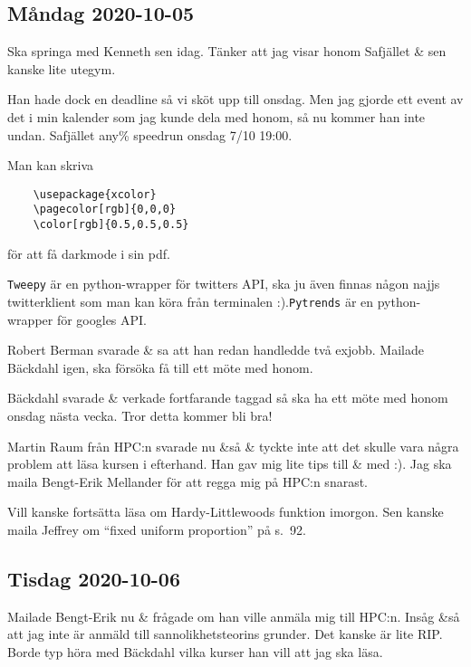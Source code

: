 \subsection{Måndag 2020-10-05}

Ska springa med Kenneth sen idag. Tänker att jag visar honom Safjället \& sen kanske lite utegym.

Han hade dock en deadline så vi sköt upp till onsdag. Men jag gjorde ett event av det i min kalender som jag kunde dela med honom, så nu kommer han inte undan. Safjället any\% speedrun onsdag 7/10 19:00.

\bigskip

Man kan skriva
\begin{verbatim}
	\usepackage{xcolor}
	\pagecolor[rgb]{0,0,0}
	\color[rgb]{0.5,0.5,0.5}
\end{verbatim}
för att få darkmode i sin pdf.

\verb|Tweepy| är en python-wrapper för twitters API, ska ju även finnas någon najjs twitterklient som man kan köra från terminalen :).\verb|Pytrends| är en python-wrapper för googles API.

\bigskip

Robert Berman svarade \& sa att han redan handledde två exjobb. Mailade Bäckdahl igen, ska försöka få till ett möte med honom.

Bäckdahl svarade \& verkade fortfarande taggad så ska ha ett möte med honom onsdag nästa vecka. Tror detta kommer bli bra!

Martin Raum från HPC:n svarade nu \&så \& tyckte inte att det skulle vara några problem att läsa kursen i efterhand. Han gav mig lite tips till \& med :). Jag ska maila Bengt-Erik Mellander för att regga mig på HPC:n snarast.

\bigskip

Vill kanske fortsätta läsa om Hardy-Littlewoods funktion imorgon. Sen kanske maila Jeffrey om \enquote{fixed uniform proportion} på s.\ 92.


\subsection{Tisdag 2020-10-06}

Mailade Bengt-Erik nu \& frågade om han ville anmäla mig till HPC:n. Insåg \&så att jag inte är anmäld till sannolikhetsteorins grunder. Det kanske är lite RIP. Borde typ höra med Bäckdahl vilka kurser han vill att jag ska läsa.

